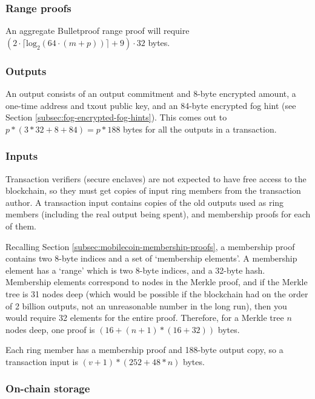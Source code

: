 \subsubsection*{Range proofs}

An aggregate Bulletproof range proof will require $(2 \cdot \lceil \textrm{log}_2(64 \cdot (m+ p)) \rceil + 9) \cdot 32$ bytes.

\subsubsection*{Outputs}

An output consists of an output commitment and 8-byte encrypted amount, a one-time address and txout public key, and an 84-byte encrypted fog hint (see Section \ref{subsec:fog-encrypted-fog-hints}). This comes out to $p*(3*32 + 8 + 84) = p*188$ bytes for all the outputs in a transaction.

\subsubsection*{Inputs}

Transaction verifiers (secure enclaves) are not expected to have free access to the blockchain, so they must get copies of input ring members from the transaction author. A transaction input contains copies of the old outputs used as ring members (including the real output being spent), and membership proofs for each of them.

Recalling Section \ref{subsec:mobilecoin-membership-proofs}, a membership proof contains two 8-byte indices and a set of `membership elements'. A membership element has a `range' which is two 8-byte indices, and a 32-byte hash. Membership elements correspond to nodes in the Merkle proof, and if the Merkle tree is 31 nodes deep (which would be possible if the blockchain had on the order of 2 billion outputs, not an unreasonable number in the long run), then you would require 32 elements for the entire proof. Therefore, for a Merkle tree $n$ nodes deep, one proof is $(16 + (n + 1)*(16 + 32))$ bytes.%

Each ring member has a membership proof and 188-byte output copy, so a transaction input is $(v + 1)*(252 + 48*n)$ bytes.

\subsubsection*{On-chain storage}

